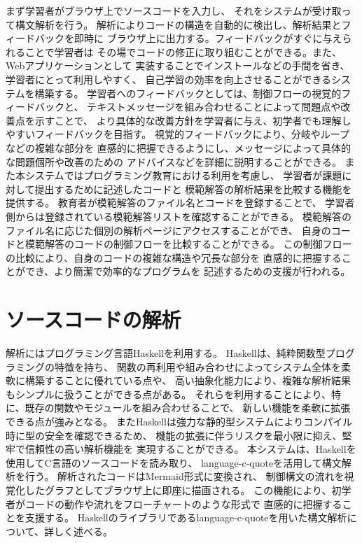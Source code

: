 \documentclass{cssspaper}
\begin{document}
        まず学習者がブラウザ上でソースコードを入力し、
        それをシステムが受け取って構文解析を行う。
        解析によりコードの構造を自動的に検出し、解析結果とフィードバックを即時に
        ブラウザ上に出力する。フィードバックがすぐに与えられることで学習者は
        その場でコードの修正に取り組むことができる。また、Webアプリケーションとして
        実装することでインストールなどの手間を省き、学習者にとって利用しやすく、
        自己学習の効率を向上させることができるシステムを構築する。
        学習者へのフィードバックとしては、制御フローの視覚的フィードバックと、
        テキストメッセージを組み合わせることによって問題点や改善点を示すことで、
        より具体的な改善方針を学習者に与え、初学者でも理解しやすいフィードバックを目指す。
        視覚的フィードバックにより、分岐やループなどの複雑な部分を
        直感的に把握できるようにし、メッセージによって具体的な問題個所や改善のための
        アドバイスなどを詳細に説明することができる。
        また本システムではプログラミング教育における利用を考慮し、
        学習者が課題に対して提出するために記述したコードと
        模範解答の解析結果を比較する機能を提供する。
        教育者が模範解答のファイル名とコードを登録することで、
        学習者側からは登録されている模範解答リストを確認することができる。
        模範解答のファイル名に応じた個別の解析ページにアクセスすることができ、
        自身のコードと模範解答のコードの制御フローを比較することができる。
        この制御フローの比較により、自身のコードの複雑な構造や冗長な部分を
        直感的に把握することができ、より簡潔で効率的なプログラムを
        記述するための支援が行われる。

        \section{ソースコードの解析}
        解析にはプログラミング言語Haskellを利用する。
        Haskellは、純粋関数型プログラミングの特徴を持ち、
        関数の再利用や組み合わせによってシステム全体を柔軟に構築することに優れている点や、
        高い抽象化能力により、複雑な解析結果もシンプルに扱うことができる点がある。
        それらを利用することにより、特に、既存の関数やモジュールを組み合わせることで、
        新しい機能を柔軟に拡張できる点が強みとなる。
        またHaskellは強力な静的型システムによりコンパイル時に型の安全を確認できるため、
        機能の拡張に伴うリスクを最小限に抑え、堅牢で信頼性の高い解析機能を
        実現することができる。
        本システムは、Haskellを使用してC言語のソースコードを読み取り、
        language-c-quoteを活用して構文解析を行う。
        解析されたコードはMermaid形式に変換され、
        制御構文の流れを視覚化したグラフとしてブラウザ上に即座に描画される。
        この機能により、初学者がコードの動作や流れをフローチャートのような形式で
        直感的に把握することを支援する。
        Haskellのライブラリであるlanguage-c-quoteを用いた構文解析について、詳しく述べる。
\end{document}
